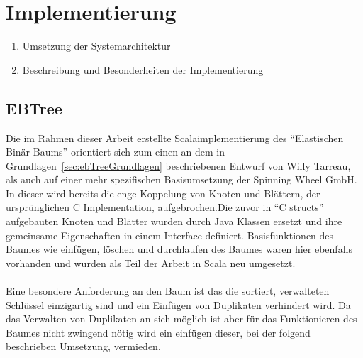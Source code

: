 \documentclass[a4paper,11pt,oneside,%
headsepline,												%
footsepline,												%
bibtotocnumbered									%
]{scrreprt}
\begin{document}
\chapter{Implementierung}
		\begin{enumerate}[1.]
			\item Umsetzung der Systemarchitektur
			\item Beschreibung und Besonderheiten der Implementierung
		\end{enumerate}

\section{EBTree} %
Die im Rahmen dieser Arbeit erstellte Scalaimplementierung des \enquote{Elastischen Binär Baums} orientiert sich zum einen an dem in Grundlagen~\ref{sec:ebTreeGrundlagen} beschriebenen Entwurf von Willy Tarreau\autocite{Tarreau}, als auch auf einer mehr spezifischen Basisumsetzung der Spinning Wheel GmbH.\\
In dieser wird bereits die enge Koppelung von Knoten und Blättern, der ursprünglichen C Implementation, aufgebrochen.Die zuvor in \enquote{C structs} aufgebauten Knoten und Blätter wurden durch Java Klassen ersetzt und ihre gemeinsame Eigenschaften in einem Interface definiert. Basisfunktionen des Baumes wie einfügen, löschen und durchlaufen des Baumes waren hier ebenfalls vorhanden und wurden als Teil der Arbeit in Scala neu umgesetzt.\\\\
Eine besondere Anforderung an den Baum ist das die sortiert, verwalteten Schlüssel einzigartig sind und ein Einfügen von Duplikaten verhindert wird. Da das Verwalten von Duplikaten an sich möglich ist aber für das Funktionieren des Baumes nicht zwingend nötig wird ein einfügen dieser, bei der folgend beschrieben Umsetzung, vermieden. \\
\end{document}
